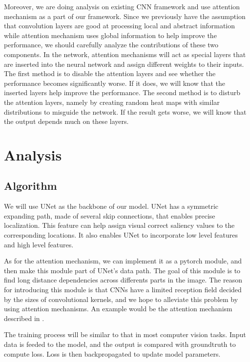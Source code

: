 \documentclass[12pt]{article}
\begin{document}
Moreover, we are doing analysis on existing CNN framework and use attention mechanism as a part of our framework. Since we previously have the assumption that convolution layers are good at processing local and abstract information while attention mechanism uses global information to help improve the performance, we should carefully analyze the contributions of these two components. In the network, attention mechanisms will act as special layers that are inserted into the neural network and assign different weights to their inputs.
The first method is to disable the attention layers and see whether the performance becomes significantly worse. If it does, we will know that the inserted layers help improve the performance.
The second method is to disturb the attention layers, namely by creating random heat maps with similar distributions to misguide the network. If the result gets worse, we will know that the output depends much on these layers.

\section{Analysis}
\subsection{Algorithm}

We will use UNet \cite{ronnebergerUNetConvolutionalNetworks2015} as the backbone of our model. UNet has a symmetric expanding path, made of
several skip connections, that enables precise localization. This feature can help assign visual correct saliency values 
to the corresponding locations. It also enables UNet to incorporate low level features and
high level features.

As for the attention mechanism, we can implement it as a pytorch module, and then make this module
part of UNet's data path. The goal of this module is to find long distance dependencies across 
differents parts in the image. The reason for introducing this module is that CNNs have a limited
reception field decided by the sizes of convolutional kernels, and we hope to alleviate this problem
by using attention mechanisms. An example would be the attention mechanism described in \cite{zhangSelfAttentionGenerativeAdversarial2019a}.

The training process will be similar to that in most computer vision tasks. Input data is feeded to the model,
and the output is compared with groundtruth to compute loss. Loss is then backpropagated to update model parameters.
\end{document}
